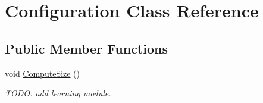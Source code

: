\hypertarget{class_configuration}{\section{Configuration Class Reference}
\label{class_configuration}
}
\subsection*{Public Member Functions}
\begin{DoxyCompactItemize}
\item 
\hypertarget{class_configuration_a862dbeec2db8af8493bbdebc9456e63f}{void \hyperlink{class_configuration_a862dbeec2db8af8493bbdebc9456e63f}{Compute\+Size} ()}\label{class_configuration_a862dbeec2db8af8493bbdebc9456e63f}

\begin{DoxyCompactList}\small\item\em T\+O\+D\+O\+: add learning module. \end{DoxyCompactList}\end{DoxyCompactItemize}
